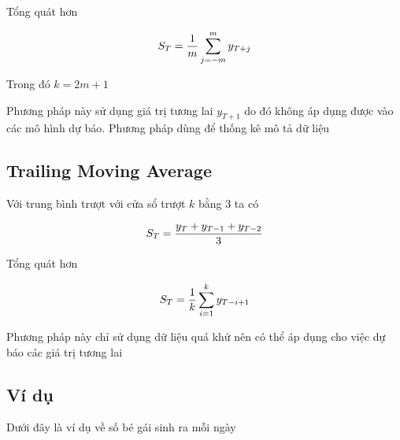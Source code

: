 \documentclass[
]{book}
\begin{document}
Tổng quát hơn

\[\begin{align}
\Large S_{T} = \frac{1}{m}  \sum_{j=-m}^{m}{y_{T+j}}
\end{align}\]

Trong đó \(k = 2m + 1\)

Phương pháp này sử dụng giá trị tương lai \(y_{T+1}\) do đó không áp dụng được vào các mô hình dự báo. Phương pháp dùng để thống kê mô tả dữ liệu

\hypertarget{trailing-moving-average}{%
\subsection{Trailing Moving Average}\label{trailing-moving-average}}

Với trung bình trượt với cửa sổ trượt \(k\) bằng 3 ta có

\[\begin{align}
\Large S_{T} = \frac{y_{T} + y_{T - 1} + y_{T - 2}}{3}
\end{align}\]

Tổng quát hơn

\[\begin{align}
\Large S_{T} = \frac{1}{k} \sum^{k}_{i=1}{y_{T-i+1}}
\end{align}\]

Phương pháp này chỉ sử dụng dữ liệu quá khứ nên có thể áp dụng cho việc dự báo các giá trị tương lai

\hypertarget{vuxed-dux1ee5}{%
\subsection{Ví dụ}\label{vuxed-dux1ee5}}

Dưới đây là ví dụ về số bé gái sinh ra mỗi ngày
\end{document}
